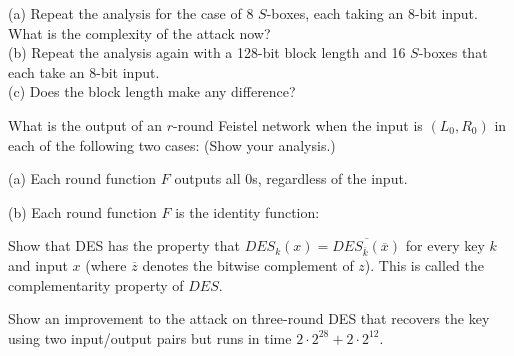 \documentclass[12pt,letterpaper,boxed]{amspset}
\begin{document}
\begin{solution}
(a) Repeat the analysis for the case of 8 $S$-boxes, each taking an 8-bit input. What is the complexity of the attack now?\\

\vspace{4cm}
\noindent (b) Repeat the analysis again with a 128-bit block length and 16 $S$-boxes that each take an 8-bit input.\\

\vspace{4cm}
\noindent (c) Does the block length make any difference?\\

\vspace{1cm}
\end{solution}

\begin{problem}[5.2]
What is the output of an $r$-round Feistel network when the input is $(L_0, R_0)$ in each of the following two cases: (Show your analysis.)
\end{problem}

\begin{solution}
(a) Each round function $F$ outputs all $0$s, regardless of the input.

\vspace{7cm}
\noindent (b) Each round function $F$ is the identity function:

\vspace{5cm}
\end{solution}

\begin{problem}[5.3]
Show that DES has the property that $DES_k(x) = \overline{DES_{\overline{k}}(\overline{x})}$ for every key $k$ and input $x$ (where $\overline{z}$ denotes the bitwise complement of $z$). This is called the complementarity property of $DES$.
\end{problem}

\begin{solution}
\vspace{4cm}
\end{solution}

\begin{problem}[5.4]
Show an improvement to the attack on three-round DES that recovers the key using two input/output pairs but runs in time $2\cdot 2^{28}+2\cdot 2^{12}$.
\end{problem}

\begin{solution}
\vspace{6cm}

\end{solution}
\end{document}
